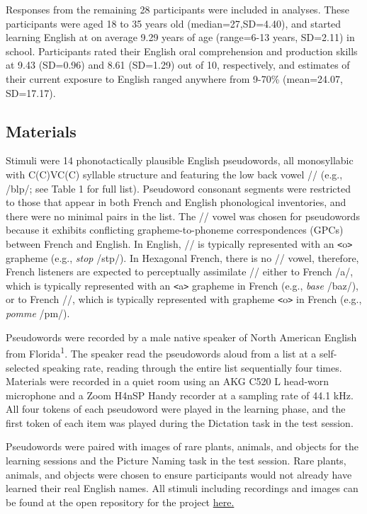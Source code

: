 \documentclass[
  english,
  man,floatsintext]{apa7}
\begin{document}
Responses from the remaining 28 participants were included in analyses. These participants were aged 18 to 35 years old (median=27,SD=4.40), and started learning English at on average 9.29 years of age (range=6-13 years, SD=2.11) in school. Participants rated their English oral comprehension and production skills at 9.43 (SD=0.96) and 8.61 (SD=1.29) out of 10, respectively, and estimates of their current exposure to English ranged anywhere from 9-70\% (mean=24.07, SD=17.17).

\subsection{Materials}\label{materials}

Stimuli were 14 phonotactically plausible English pseudowords, all monosyllabic with C(C)VC(C) syllable structure and featuring the low back vowel /\textscripta/ (e.g., /bl\textscripta p/; see Table 1 for full list). Pseudoword consonant segments were restricted to those that appear in both French and English phonological inventories, and there were no minimal pairs in the list. The /\textscripta/ vowel was chosen for pseudowords because it exhibits conflicting grapheme-to-phoneme correspondences (GPCs) between French and English. In English, /\textscripta/ is typically represented with an \texttt{\textless{}}o\texttt{\textgreater{}} grapheme (e.g., \emph{stop} /st\textscripta p/). In Hexagonal French, there is no /\textscripta/ vowel, therefore, French listeners are expected to perceptually assimilate /\textscripta/ either to French /a/, which is typically represented with an \texttt{\textless{}}a\texttt{\textgreater{}} grapheme in French (e.g., \emph{base} /baz/), or to French /\textopeno/, which is typically represented with grapheme \texttt{\textless{}}o\texttt{\textgreater{}} in French (e.g., \emph{pomme} /p\textopeno m/).

Pseudowords were recorded by a male native speaker of North American English from Florida\textsuperscript{1}. The speaker read the pseudowords aloud from a list at a self-selected speaking rate, reading through the entire list sequentially four times. Materials were recorded in a quiet room using an AKG C520 L head-worn microphone and a Zoom H4nSP Handy recorder at a sampling rate of 44.1 kHz. All four tokens of each pseudoword were played in the learning phase, and the first token of each item was played during the Dictation task in the test session.

Pseudowords were paired with images of rare plants, animals, and objects for the learning sessions and the Picture Naming task in the test session. Rare plants, animals, and objects were chosen to ensure participants would not already have learned their real English names. All stimuli including recordings and images can be found at the open repository for the project \href{https://github.com/anonautforsub4556743/Ortho-knowledge-auditory-L2-word-learning}{here.}
\end{document}
